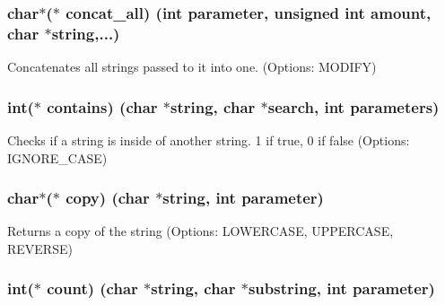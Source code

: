 \subsubsection[{concat\+\_\+all}]{\setlength{\rightskip}{0pt plus 5cm}char$\ast$($\ast$ concat\+\_\+all) (int parameter, unsigned int amount, char $\ast$string,...)}\label{struct_string___utils_a490b7ad14aa39447ea1e261b3f5398fa}


Concatenates all strings passed to it into one. (Options\+: M\+O\+D\+I\+F\+Y) 

\hypertarget{struct_string___utils_a3f85784009f04048b40078fc2a86bd93}{}
\subsubsection[{contains}]{\setlength{\rightskip}{0pt plus 5cm}int($\ast$ contains) (char $\ast$string, char $\ast$search, int parameters)}\label{struct_string___utils_a3f85784009f04048b40078fc2a86bd93}


Checks if a string is inside of another string. 1 if true, 0 if false (Options\+: I\+G\+N\+O\+R\+E\+\_\+\+C\+A\+S\+E) 

\hypertarget{struct_string___utils_a75ebff0bc901abc33f30d46f5db88d66}{}
\subsubsection[{copy}]{\setlength{\rightskip}{0pt plus 5cm}char$\ast$($\ast$ copy) (char $\ast$string, int parameter)}\label{struct_string___utils_a75ebff0bc901abc33f30d46f5db88d66}


Returns a copy of the string (Options\+: L\+O\+W\+E\+R\+C\+A\+S\+E, U\+P\+P\+E\+R\+C\+A\+S\+E, R\+E\+V\+E\+R\+S\+E) 

\hypertarget{struct_string___utils_aad837adc48fdcd287e13c6e845350541}{}
\subsubsection[{count}]{\setlength{\rightskip}{0pt plus 5cm}int($\ast$ count) (char $\ast$string, char $\ast${\bf substring}, int parameter)}\label{struct_string___utils_aad837adc48fdcd287e13c6e845350541}



